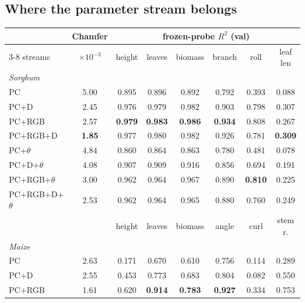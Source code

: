 \subsection{Where the parameter stream belongs}
\label{sec:param-stream}

\begin{table}[t]
  \centering\scriptsize
  \setlength{\tabcolsep}{3.2pt}
  \begin{tabular}{l c cccccc}
    \toprule
    & Chamfer & \multicolumn{6}{c}{frozen-probe $R^2$ (val)} \\
    \cmidrule(lr){3-8}
    streams & $\times10^{-3}$ & height & leaves & biomass & branch & roll & leaf len \\
    \midrule
    \multicolumn{8}{l}{\emph{Sorghum}} \\
    PC                 & 5.00 & 0.895 & 0.896 & 0.892 & 0.792 & 0.393 & 0.088 \\
    PC+D               & 2.45 & 0.976 & 0.979 & 0.982 & 0.903 & 0.798 & 0.307 \\
    PC+RGB             & 2.57 & \textbf{0.979} & \textbf{0.983} & \textbf{0.986} & \textbf{0.934} & 0.808 & 0.267 \\
    PC+RGB+D           & \textbf{1.85} & 0.977 & 0.980 & 0.982 & 0.926 & 0.781 & \textbf{0.309} \\
    PC+$\theta$        & 4.84 & 0.860 & 0.864 & 0.863 & 0.780 & 0.481 & 0.078 \\
    PC+D+$\theta$      & 4.08 & 0.907 & 0.909 & 0.916 & 0.856 & 0.694 & 0.191 \\
    PC+RGB+$\theta$    & 3.00 & 0.962 & 0.964 & 0.967 & 0.890 & \textbf{0.810} & 0.225 \\
    PC+RGB+D+$\theta$  & 2.53 & 0.962 & 0.964 & 0.965 & 0.880 & 0.760 & 0.249 \\
    \midrule
    & & height & leaves & biomass & angle & curl & stem r. \\
    \multicolumn{8}{l}{\emph{Maize}} \\
    PC                 & 2.63 & 0.171 & 0.670 & 0.610 & 0.756 & 0.114 & 0.289 \\
    PC+D               & 2.55 & 0.453 & 0.773 & 0.683 & 0.804 & 0.082 & 0.550 \\
    PC+RGB             & 1.61 & 0.620 & \textbf{0.914} & \textbf{0.783} & \textbf{0.927} & 0.334 & 0.753 \\

\end{tabular}
\end{table}
